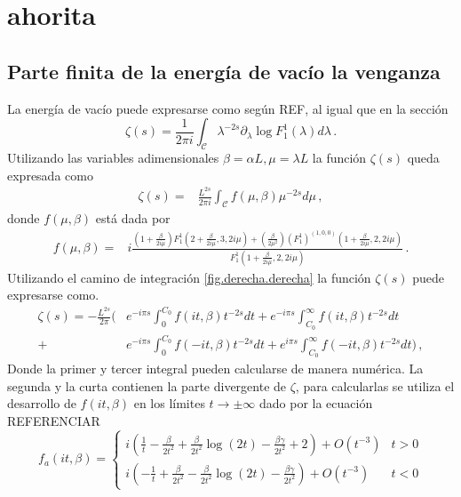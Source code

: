 \chapter{ahorita}

\section{Parte finita de la energía de vacío la venganza }

La energía de vacío puede expresarse como según REF, al igual que en la sección
\begin{equation}
	\zeta (s) = 
	\frac{1}{2 \pi i} \int _{\mathcal{C}} 
						\lambda ^{-2s}
						\partial _ \lambda 
						\log F _1 ^{1} ( \lambda )
						d \lambda
	\, .
\end{equation}
Utilizando las variables adimensionales $\beta = \alpha L, \mu = \lambda L$ la función $\zeta (s)$ queda expresada como
\begin{align}
	\zeta (s) =& 
	\frac{L ^{2s}}{2 \pi i} \int _{\mathcal{C}} 
	f (\mu , \beta) \mu ^{-2s} d \mu 
\, ,
\end{align}
donde $f( \mu, \beta)$ está dada por
\begin{align}
f(\mu, \beta) =& 	
i
\frac{
		\left(1 + \frac{ \beta}{2 i \mu} \right) 
		F _1 ^1 
			\left( 2 + \frac{ \beta}{2 i \mu} ,3 ,2 i \mu \right)
		+ \left( \frac{\beta				
				}
				{2 \mu ^2 } 
				\right)
				( F _{1} ^1 ) ^{(1,0,0)}
				\left( 1 + \frac{\beta}{2 i \mu} ,2 ,2 i \mu
						\right)
		}
		{F _1 ^1 \left( 1 + \frac{\beta}{2 i \mu},2,2 i \mu \right)} 
\, .		
\nonumber
\end{align}
Utilizando el camino de integración \ref{fig.derecha.derecha} la función $\zeta (s)$ puede expresarse como.
\begin{align*}
\zeta (s) = 
- \frac{L ^{2s}}{2 \pi } 
\Bigg(&	  e ^{- i \pi s} \int _0 ^{C _0}
			f (i t,\beta )
			t ^{-2s}  dt 
		+ e ^{- i \pi s} \int _{C _0} ^{\infty}
			f (i t,\beta )
			t ^{-2s}  dt \\
		+&e ^{-i \pi s} \int _{0} ^{C _0} 
			f (-i t,\beta )
			t ^{-2s}  dt 
		+ e ^{i \pi s} \int _{C _0} ^{\infty}
			f (-i t,\beta )
			t ^{-2s}  dt 
	\Bigg)
\, ,
\end{align*}
Donde la primer y tercer integral pueden calcularse de manera numérica. La segunda y la curta contienen la parte divergente de $\zeta$, para calcularlas se utiliza el desarrollo de  $f(i t,\beta)$ en los límites $t \rightarrow \pm \infty$ dado por la ecuación REFERENCIAR
\[ 
f  _a ( i t ,\beta )=
\begin{cases} 
	  i  \left(
			\frac{1}{t} - \frac{\beta}{2 t ^2 } + \frac{\beta}{2 t^2}
			\log (2 t) - \frac{\beta \gamma}{2 t^2} + 2
			\right) + O (t ^{-3})
	  & t > 0 \\
      i  \left(
			- \frac{1}{t} + \frac{\beta}{2 t ^2 } - \frac{\beta}{2 t^2}
			\log (2 t) - \frac{\beta \gamma}{2 t^2} 
			\right) + O (t ^{-3})
      & t < 0
   \end{cases}   
\]
